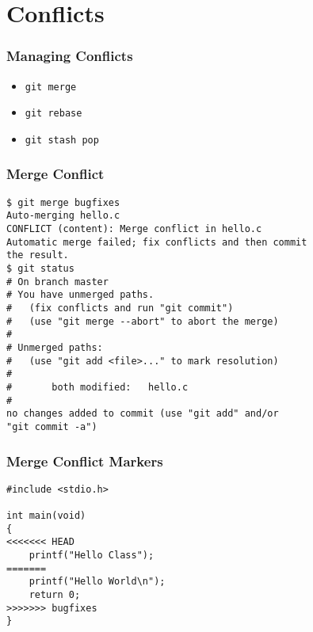 \section[Section]{Conflicts}

\begin{frame}
    \frametitle{Managing Conflicts}
    \begin{itemize}
        \item \texttt{git merge}
        \item \texttt{git rebase}
        \item \texttt{git stash pop}
    \end{itemize}
\end{frame}

\begin{frame}[fragile]
    \frametitle{Merge Conflict}
    \small
    \begin{verbatim}
$ git merge bugfixes
Auto-merging hello.c
CONFLICT (content): Merge conflict in hello.c
Automatic merge failed; fix conflicts and then commit
the result.
$ git status
# On branch master
# You have unmerged paths.
#   (fix conflicts and run "git commit")
#   (use "git merge --abort" to abort the merge)
#
# Unmerged paths:
#   (use "git add <file>..." to mark resolution)
#
#       both modified:   hello.c
#
no changes added to commit (use "git add" and/or
"git commit -a")
    \end{verbatim}
\end{frame}

\begin{frame}[fragile]
    \frametitle{Merge Conflict Markers}
    \small
    \begin{verbatim}
#include <stdio.h>

int main(void)
{
<<<<<<< HEAD
    printf("Hello Class");
=======
    printf("Hello World\n");
    return 0;
>>>>>>> bugfixes
}
    \end{verbatim}
\end{frame}


